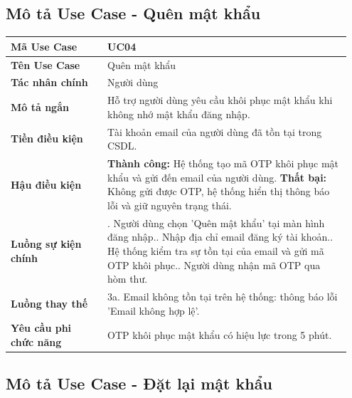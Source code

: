 \documentclass[a4paper,oneside]{report}
\begin{document}
\subsection{Mô tả Use Case - Quên mật khẩu}

\begin{longtable}[]{@{}>{\RaggedRight\arraybackslash}p{0.27\linewidth}>{\RaggedRight\arraybackslash}p{0.68\linewidth}@{}}
\toprule
\textbf{Mã Use Case} & UC04\tabularnewline
\midrule
\endhead
\textbf{Tên Use Case} & Quên mật khẩu\tabularnewline
\textbf{Tác nhân chính} & Người dùng\tabularnewline
\textbf{Mô tả ngắn} & Hỗ trợ người dùng yêu cầu khôi phục mật khẩu khi
không nhớ mật khẩu đăng nhập.\tabularnewline
\textbf{Tiền điều kiện} & Tài khoản email của người dùng đã tồn tại
trong CSDL.\tabularnewline
\textbf{Hậu điều kiện} & \textbf{Thành công:} Hệ thống tạo mã OTP khôi phục mật khẩu và gửi đến email của người dùng.\newline 
\textbf{Thất bại:} Không gửi được OTP, hệ thống hiển thị thông báo lỗi và giữ nguyên trạng thái.\tabularnewline
\textbf{Luồng sự kiện chính} & 1. Người dùng chọn
'Quên mật khẩu' tại màn hình đăng nhập.\newline 2. Nhập địa chỉ
email đăng ký tài khoản.\newline 3. Hệ thống kiểm tra sự tồn tại
của email và gửi mã OTP khôi phục.\newline 4. Người dùng nhận mã
OTP qua hòm thư.\tabularnewline
\textbf{Luồng thay thế} & 3a. Email không tồn tại trên hệ thống: thông
báo lỗi 'Email không hợp lệ'.\tabularnewline
\textbf{Yêu cầu phi chức năng} & OTP khôi phục mật khẩu có hiệu lực
trong 5 phút.\tabularnewline
\bottomrule
\end{longtable}

\subsection{Mô tả Use Case - Đặt lại mật khẩu}
\end{document}
